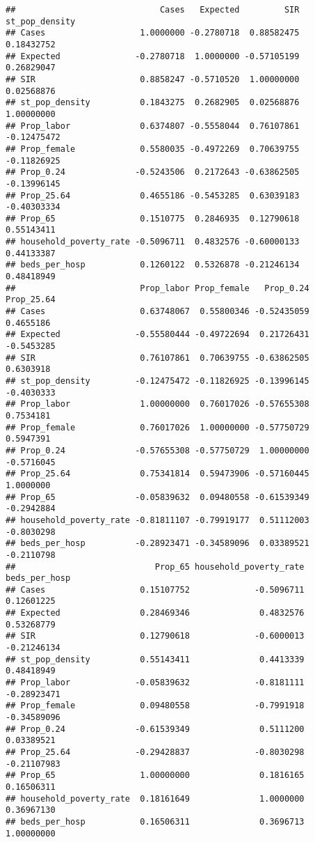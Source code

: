 \documentclass[]{article}
\begin{document}
\begin{verbatim}
##                             Cases   Expected         SIR st_pop_density
## Cases                   1.0000000 -0.2780718  0.88582475     0.18432752
## Expected               -0.2780718  1.0000000 -0.57105199     0.26829047
## SIR                     0.8858247 -0.5710520  1.00000000     0.02568876
## st_pop_density          0.1843275  0.2682905  0.02568876     1.00000000
## Prop_labor              0.6374807 -0.5558044  0.76107861    -0.12475472
## Prop_female             0.5580035 -0.4972269  0.70639755    -0.11826925
## Prop_0.24              -0.5243506  0.2172643 -0.63862505    -0.13996145
## Prop_25.64              0.4655186 -0.5453285  0.63039183    -0.40303334
## Prop_65                 0.1510775  0.2846935  0.12790618     0.55143411
## household_poverty_rate -0.5096711  0.4832576 -0.60000133     0.44133387
## beds_per_hosp           0.1260122  0.5326878 -0.21246134     0.48418949
##                         Prop_labor Prop_female   Prop_0.24 Prop_25.64
## Cases                   0.63748067  0.55800346 -0.52435059  0.4655186
## Expected               -0.55580444 -0.49722694  0.21726431 -0.5453285
## SIR                     0.76107861  0.70639755 -0.63862505  0.6303918
## st_pop_density         -0.12475472 -0.11826925 -0.13996145 -0.4030333
## Prop_labor              1.00000000  0.76017026 -0.57655308  0.7534181
## Prop_female             0.76017026  1.00000000 -0.57750729  0.5947391
## Prop_0.24              -0.57655308 -0.57750729  1.00000000 -0.5716045
## Prop_25.64              0.75341814  0.59473906 -0.57160445  1.0000000
## Prop_65                -0.05839632  0.09480558 -0.61539349 -0.2942884
## household_poverty_rate -0.81811107 -0.79919177  0.51112003 -0.8030298
## beds_per_hosp          -0.28923471 -0.34589096  0.03389521 -0.2110798
##                            Prop_65 household_poverty_rate beds_per_hosp
## Cases                   0.15107752             -0.5096711    0.12601225
## Expected                0.28469346              0.4832576    0.53268779
## SIR                     0.12790618             -0.6000013   -0.21246134
## st_pop_density          0.55143411              0.4413339    0.48418949
## Prop_labor             -0.05839632             -0.8181111   -0.28923471
## Prop_female             0.09480558             -0.7991918   -0.34589096
## Prop_0.24              -0.61539349              0.5111200    0.03389521
## Prop_25.64             -0.29428837             -0.8030298   -0.21107983
## Prop_65                 1.00000000              0.1816165    0.16506311
## household_poverty_rate  0.18161649              1.0000000    0.36967130
## beds_per_hosp           0.16506311              0.3696713    1.00000000
\end{verbatim}
\end{document}
